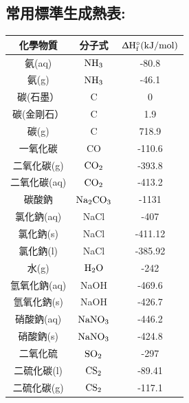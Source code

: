 \subsection{常用標準生成熱表:}
\begin{longtable}{|c|c|c|}
\hline
\textbf{化學物質} & \textbf{分子式} & $\rm\Updelta H^{\circ}_f(kJ/mol)$ \\ \hline
氨(aq)         & $\rm NH_3$          & -80.8                   \\ \hline
氨(g)          & $\rm NH_3$          & -46.1                   \\ \hline
碳(石墨）         & C            & 0                       \\ \hline
碳(金剛石）        & C            & 1.9                     \\ \hline
碳(g)          & C            & 718.9                   \\ \hline
一氧化碳          & CO           & -110.6                  \\ \hline
二氧化碳(g)       & $\rm CO_2$          & -393.8                  \\ \hline
二氧化碳(aq)      & $\rm CO_2$          & -413.2                  \\ \hline
碳酸鈉           & $\rm Na_2CO_3$       & -1131                   \\ \hline
氯化鈉(aq)       & NaCl         & -407                    \\ \hline
氯化鈉(s)        & NaCl         & -411.12                 \\ \hline
氯化鈉(l)        & NaCl         & -385.92                 \\ \hline
水(g)          & $\rm H_2O$          & -242                    \\ \hline
氫氧化鈉(aq)      & NaOH         & -469.6                  \\ \hline
氫氧化鈉(s)       & NaOH         & -426.7                  \\ \hline
硝酸鈉(aq)       & $\rm NaNO_3$        & -446.2                  \\ \hline
硝酸鈉(s)        & $\rm NaNO_3$        & -424.8                  \\ \hline
二氧化硫          & $\rm SO_2$          & -297                    \\ \hline
二硫化碳(l)       & $\rm CS_2$          & -89.41                  \\ \hline
二硫化碳(g)       & $\rm CS_2$          & -117.1                  \\ \hline

\end{longtable}

